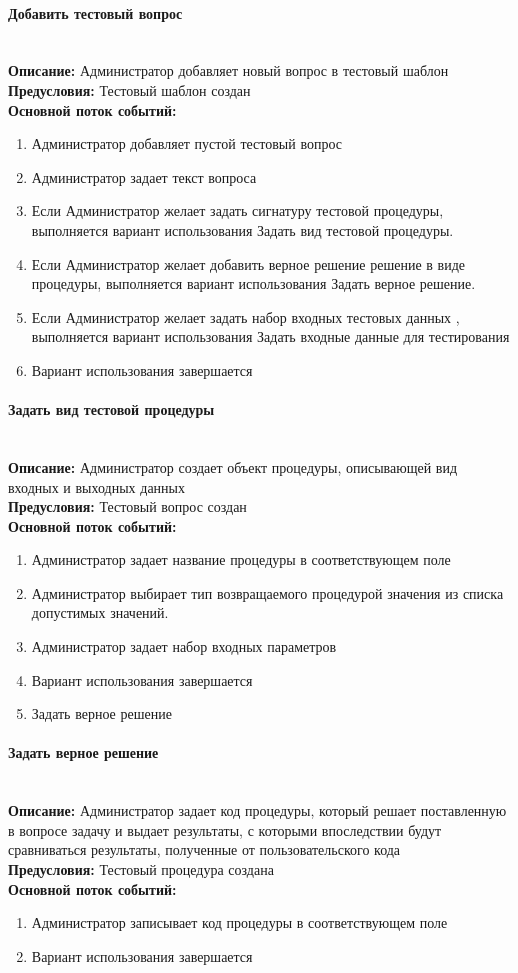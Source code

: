 \documentclass{article}
\newcommand{\paragraphline}[1]{\paragraph{#1}\mbox{}\\}
\begin{document}
    \paragraphline{Добавить тестовый вопрос}
    \textbf{Описание:} Администратор добавляет новый вопрос в тестовый шаблон\\
    \textbf{Предусловия:} Тестовый шаблон создан\\
    \textbf{Основной поток событий:}
    \begin{enumerate}
        \item Администратор добавляет пустой тестовый вопрос
        \item Администратор задает текст вопроса
        \item Если Администратор желает задать сигнатуру тестовой процедуры, выполняется вариант использования Задать вид тестовой процедуры.
        \item Если Администратор желает добавить верное решение решение в виде процедуры, выполняется вариант использования Задать верное решение.
        \item Если Администратор желает задать набор входных тестовых данных , выполняется вариант использования Задать входные данные для тестирования
        \item Вариант использования завершается
    \end{enumerate}


    \paragraphline{Задать вид тестовой процедуры}
    \textbf{Описание:} Администратор создает объект процедуры, описывающей вид входных и выходных данных\\
    \textbf{Предусловия:} Тестовый вопрос создан\\
    \textbf{Основной поток событий:}
    \begin{enumerate}
        \item Администратор задает название процедуры в соответствующем поле
        \item Администратор выбирает тип возвращаемого процедурой значения из списка допустимых значений.
        \item Администратор задает набор входных параметров
        \item Вариант использования завершается
        \item Задать верное решение
    \end{enumerate}
    
    \paragraphline{Задать верное решение}
    \textbf{Описание:} Администратор задает код процедуры, который решает поставленную в вопросе задачу и выдает результаты, с которыми впоследствии будут сравниваться результаты, полученные от пользовательского кода\\
    \textbf{Предусловия:} Тестовый процедура создана\\
    \textbf{Основной поток событий:}
    \begin{enumerate}
        \item Администратор записывает код процедуры в соответствующем поле
        \item Вариант использования завершается
    \end{enumerate}
\end{document}
